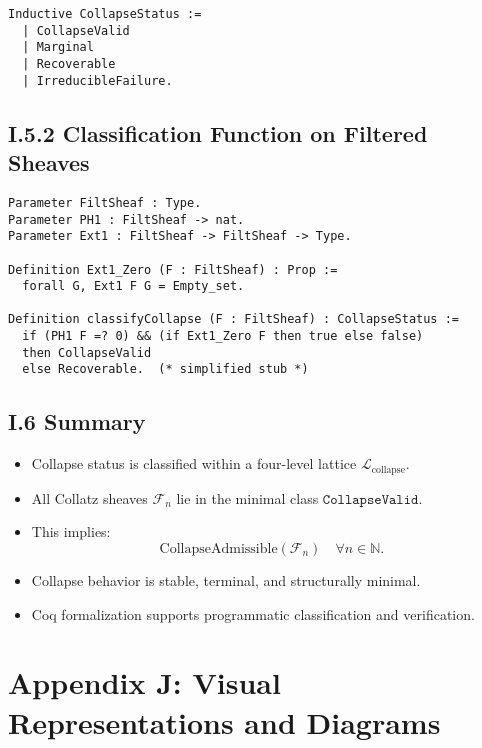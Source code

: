 \documentclass[11pt]{article}
\begin{document}
\begin{lstlisting}[language=Coq]
Inductive CollapseStatus :=
  | CollapseValid
  | Marginal
  | Recoverable
  | IrreducibleFailure.
\end{lstlisting}

\subsection*{I.5.2 Classification Function on Filtered Sheaves}

\begin{lstlisting}[language=Coq]
Parameter FiltSheaf : Type.
Parameter PH1 : FiltSheaf -> nat.
Parameter Ext1 : FiltSheaf -> FiltSheaf -> Type.

Definition Ext1_Zero (F : FiltSheaf) : Prop :=
  forall G, Ext1 F G = Empty_set.

Definition classifyCollapse (F : FiltSheaf) : CollapseStatus :=
  if (PH1 F =? 0) && (if Ext1_Zero F then true else false)
  then CollapseValid
  else Recoverable.  (* simplified stub *)
\end{lstlisting}

\subsection*{I.6 Summary}

\begin{itemize}
  \item Collapse status is classified within a four-level lattice \( \mathcal{L}_{\mathrm{collapse}} \).
  \item All Collatz sheaves \( \mathcal{F}_n \) lie in the minimal class \( \texttt{CollapseValid} \).
  \item This implies:
  \[
  \text{CollapseAdmissible}(\mathcal{F}_n) \quad \forall n \in \mathbb{N}.
  \]
  \item Collapse behavior is stable, terminal, and structurally minimal.
  \item Coq formalization supports programmatic classification and verification.
\end{itemize}



\appendix
\section*{Appendix J: Visual Representations and Diagrams}
\end{document}
